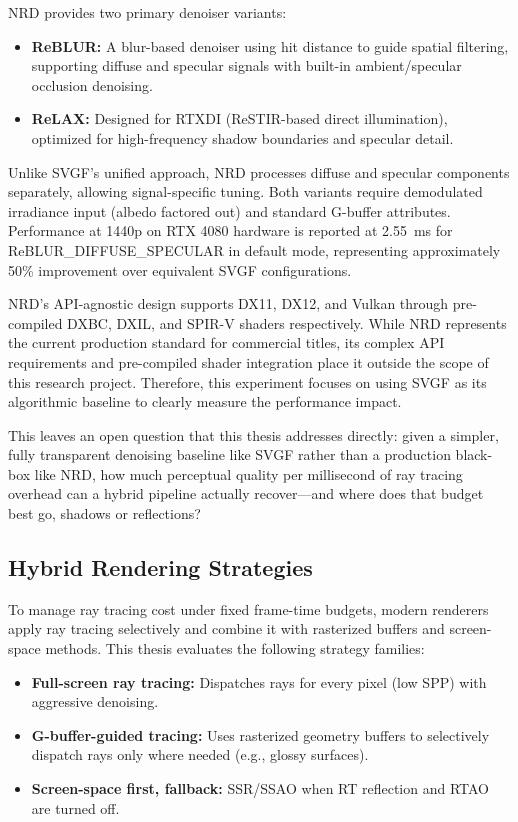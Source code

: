 \documentclass[12pt,a4paper]{report}
\begin{document}
NRD provides two primary denoiser variants:
\begin{itemize}
    \item \textbf{ReBLUR:} A blur-based denoiser using hit distance to guide 
          spatial filtering, supporting diffuse and specular signals with 
          built-in ambient/specular occlusion denoising.
    \item \textbf{ReLAX:} Designed for RTXDI (ReSTIR-based direct illumination), 
          optimized for high-frequency shadow boundaries and specular detail.
\end{itemize}

Unlike SVGF's unified approach, NRD processes diffuse and specular components 
separately, allowing signal-specific tuning. Both variants require demodulated 
irradiance input (albedo factored out) and standard G-buffer attributes. 
Performance at 1440p on RTX 4080 hardware is reported at 2.55~ms for 
ReBLUR\_DIFFUSE\_SPECULAR in default mode, representing approximately 50\% 
improvement over equivalent SVGF configurations\cite{nvidia_nrd_github}.

NRD's API-agnostic design supports DX11, DX12, and Vulkan through pre-compiled 
DXBC, DXIL, and SPIR-V shaders respectively. While NRD represents the current production standard for commercial titles,
its complex API requirements and pre-compiled shader integration place it outside the scope of this research project. Therefore, this experiment focuses on using SVGF as its algorithmic baseline to clearly measure the performance impact.

This leaves an open question that this thesis addresses directly: given a simpler,
fully transparent denoising baseline like SVGF rather than a production black-box like NRD,
how much perceptual quality per millisecond of ray tracing overhead can a hybrid pipeline actually recover---and where does that budget best go, shadows or reflections?

\subsection{Hybrid Rendering Strategies}
To manage ray tracing cost under fixed frame-time budgets, modern renderers
apply ray tracing selectively and combine it with rasterized buffers and
screen-space methods. This thesis evaluates the following strategy families:
\begin{itemize}
    \item \textbf{Full-screen ray tracing:} Dispatches rays for every pixel (low SPP) with aggressive denoising.
    \item \textbf{G-buffer-guided tracing:} Uses rasterized geometry buffers to selectively dispatch rays only where needed (e.g., glossy surfaces).
    \item \textbf{Screen-space first, fallback:} SSR/SSAO when RT reflection and RTAO are turned off.
\end{itemize}
\end{document}
